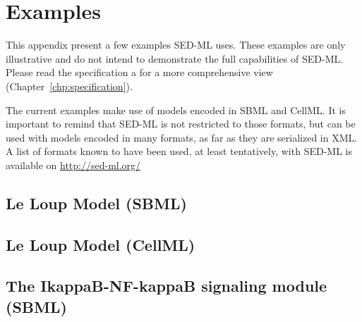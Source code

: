 \chapter{Examples}

This appendix present a few examples SED-ML uses. These examples are only illustrative and do not intend to demonstrate the full capabilities of SED-ML. Please read the specification a for a more comprehensive view (Chapter~\ref{chp:specification}). 

The current examples make use of models encoded in SBML and CellML. It is important to remind that SED-ML is not restricted to those formats, but can be used with models encoded in many formats, as far as they are serialized in XML. A list of formats known to have been used, at least tentatively, with SED-ML is available on \url{http://sed-ml.org/}

\section{Le Loup Model (SBML)}


\section{Le Loup Model (CellML)}


\newpage
\section{The IkappaB-NF-kappaB signaling module (SBML)}
